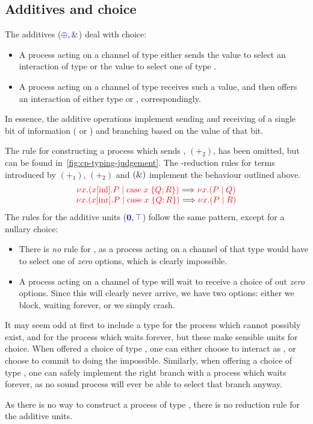 \subsection{Additives and choice}
\label{sec:cp-additives}
The additives ($\textcolor{blue}{\oplus}, \textcolor{blue}{\mathbin{\text{\&}}}$) deal with choice:
\begin{itemize}
\item
  A process acting on a channel of type  either sends the value
   to select an interaction of type  or the value
   to select one of type . 
\item
  A process acting on a channel of type  receives such a value,
  and then offers an interaction of either type  or ,
  correspondingly.
\end{itemize}
In essence, the additive operations implement sending and receiving of a single
bit of information ( or ) and branching based on
the value of that bit. 
\begin{center}
  \cpInfWith
\end{center}
The rule for constructing a process which sends , $(\plus_2)$,
has been omitted, but can be found in~\cref{fig:cp-typing-judgement}.
The \textbeta-reduction rules for terms introduced by $(\plus_1)$, $(\plus_2)$
and $(\mathbin{\text{\&}})$ implement the behaviour outlined above.
\[
  \begin{array}{c}
    \textcolor{red}{\nu x.(x[\text{inl}].P \mid \text{case}\;x\;\{Q;R\})} \Longrightarrow \textcolor{red}{\nu x.(P \mid Q)}
    \\
    \textcolor{red}{\nu x.(x[\text{inr}].P \mid \text{case}\;x\;\{Q;R\})} \Longrightarrow \textcolor{red}{\nu x.(P \mid R)}
  \end{array}
\]
%
The rules for the additive units ($\textcolor{blue}{\mathbf{0}}, \textcolor{blue}{\top}$) follow the same
pattern, except for a nullary choice:
\begin{itemize}
\item
  There is \emph{no} rule for \ty{\nil}, as a process acting on a channel of
  that type would have to select one of \emph{zero} options, which is clearly
  impossible.
\item
  A process acting on a channel of type \ty{\top} will wait to receive a choice
  of out \emph{zero} options. Since this will clearly never arrive, we have two
  options: either we block, waiting forever, or we simply crash.
\end{itemize}
It may seem odd at first to include a type for the process which cannot possibly
exist, and for the process which waits forever, but these make sensible units
for choice.
When offered a choice of type , one can either choose to
interact as , or choose to commit to doing the impossible.
Similarly, when offering a choice of type , one can safely
implement the right branch with a process which waits forever, as no sound
process will ever be able to select that branch anyway.
\begin{center}
  \cpInfNil
  \cpInfTop
\end{center}
As there is no way to construct a process of type \ty{\nil}, there is no
reduction rule for the additive units.


